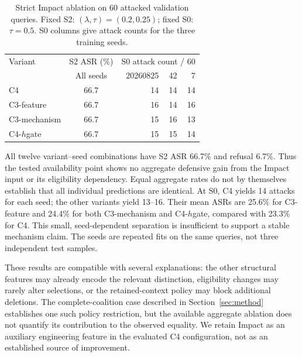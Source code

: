 \documentclass[sigconf]{aamas}
\begin{document}
\begin{table}[t]
\caption{Strict Impact ablation on 60 attacked validation queries. Fixed S2: $(\lambda,\tau)=(0.2,0.25)$; fixed S0: $\tau=0.5$. S0 columns give attack counts for the three training seeds.}
\label{tab:ablation}
\centering
\begin{tabular}{lcrrr}
\toprule
Variant & S2 ASR (\%) & \multicolumn{3}{c}{S0 attack count / 60}\\
 & All seeds & 20260825 & 42 & 7\\
\midrule
C4 & 66.7 & 14 & 14 & 14\\
C3-feature & 66.7 & 16 & 14 & 16\\
C3-mechanism & 66.7 & 15 & 16 & 13\\
C4-$h$gate & 66.7 & 15 & 15 & 14\\
\bottomrule
\end{tabular}
\end{table}

All twelve variant--seed combinations have S2 ASR 66.7\% and refusal 6.7\%. Thus the tested availability point shows no aggregate defensive gain from the Impact input or its eligibility dependency. Equal aggregate rates do not by themselves establish that all individual predictions are identical. At S0, C4 yields 14 attacks for each seed; the other variants yield 13--16. Their mean ASRs are 25.6\% for C3-feature and 24.4\% for both C3-mechanism and C4-$h$gate, compared with 23.3\% for C4. This small, seed-dependent separation is insufficient to support a stable mechanism claim. The seeds are repeated fits on the same queries, not three independent test samples.

These results are compatible with several explanations: the other structural features may already encode the relevant distinction, eligibility changes may rarely alter selections, or the retained-context policy may block additional deletions. The complete-coalition case described in Section~\ref{sec:method} establishes one such policy restriction, but the available aggregate ablation does not quantify its contribution to the observed equality. We retain Impact as an auxiliary engineering feature in the evaluated C4 configuration, not as an established source of improvement.
\end{document}
